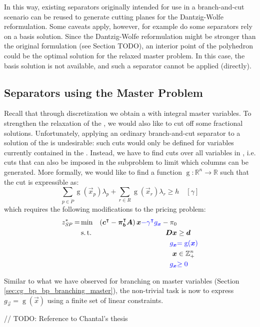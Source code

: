 In this way, existing separators originally intended for use in a branch-and-cut scenario can be reused to generate cutting planes for the Dantzig-Wolfe reformulation. Some caveats apply, however, for example do some separators rely on a basis solution. Since the Dantzig-Wolfe reformulation might be stronger than the original formulation (see Section \cite{TODO} TODO), an interior point of the polyhedron could be the optimal solution for the relaxed master problem. In this case, the basis solution is not available, and such a separator cannot be applied (directly).

\subsection{Separators using the Master Problem}\label{sec:cg_bp_bpc_separators_master}
Recall that through discretization we obtain a \MP{} with integral master variables. To strengthen the \LP{} relaxation of the \MP{}, we would also like to cut off some fractional solutions. Unfortunately, applying an ordinary branch-and-cut separator to a solution of the \RMP{} is undesirable: such cuts would only be defined for variables currently contained in the \RMP{}. Instead, we have to find cuts over all variables in \MP{}, i.e. cuts that can also be imposed in the subproblem to limit which columns can be generated. More formally, we would like to find a function $\operatorname{g}: \mathbb{R}^n \to \mathbb{R}$ such that the cut is expressible as:
\begin{equation}
\sum_{p \in \ddot{P}} \operatorname{g}( \vec{x}_p ) \lambda_p + \sum_{r \in R} \operatorname{g}(  \vec{x}_r ) \lambda_r \geq h \quad \left[ \gamma \right]
\end{equation}
which requires the following modifications to the pricing problem:
\begin{equation}
\begin{aligned}
z^*_\SP{} = &\min & \left( \vec{c}\transpose - \vec{\pi}_\vec{b}\transpose \mat{A} \right) \vec{x} {\color{blue} - \gamma\transpose g_\vec{x}} - \pi_0 & \\
&\st & \mat{D} \vec{x} & \geq \vec{d} \\
&& {\color{blue} g_\vec{x}} & {\color{blue} = \operatorname{g}(\vec{x})} \\
&& \vec{x} & \in \mathbb{Z}_+^n \\
&& {\color{blue} g_\vec{x}} & {\color{blue} \geq 0}
\end{aligned}
\end{equation}

Similar to what we have observed for branching on master variables (Section \ref{sec:cg_bp_bp_branching_master}), the non-trivial task is now to express $g_\vec{x} = \operatorname{g}(\vec{x})$ using a finite set of linear constraints.

// TODO: Reference to Chantal's thesis
